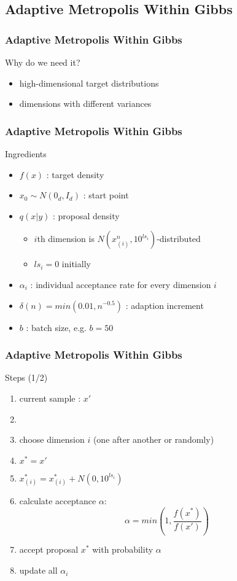 
\subsection{Adaptive Metropolis Within Gibbs}
\begin{frame}
\frametitle{Adaptive Metropolis Within Gibbs}
\begin{block}{Why do we need it?}
\begin{itemize}
\item high-dimensional target distributions
\item dimensions with different variances
\end{itemize}
\end{block}

\end{frame}


\begin{frame}
\frametitle{Adaptive Metropolis Within Gibbs}

\begin{block}{Ingredients}
\begin{itemize}
\item $f(x)$ : target density
\item $x_0 \sim N(0_d, I_d)$ : start point
\item $q(x|y)$ : proposal density
\begin{itemize}
  \item $i$th dimension is $ N(x_{(i)}^n, 10^{ls_i})$-distributed
  \item $ls_i = 0$ initially
\end{itemize}
 \item $\alpha_i$ : individual acceptance rate for every dimension $i$
\item $\delta(n) = min(0.01, n^{-0.5})$ : adaption increment
\item $b$ : batch size, e.g. $b=50$
\end{itemize}
\end{block}

\end{frame}




\begin{frame}
\frametitle{Adaptive Metropolis Within Gibbs}

\begin{block}{Steps (1/2)}
\begin{enumerate}
  \item current sample : $x'$
  \item[]
\item choose dimension $i$ (one after another or randomly)
\item $x^* = x'$
\item $x^*_{(i)} = x^*_{(i)} + N(0, 10^{ls_i})$
\item calculate acceptance $\alpha$:
\[\alpha = min\left(1, \frac{f(x^*)}{f(x')} \right)\]

\item accept proposal $x^*$ with probability $\alpha$
\item update all $\alpha_i$
\end{enumerate}
\end{block}
\end{frame}

